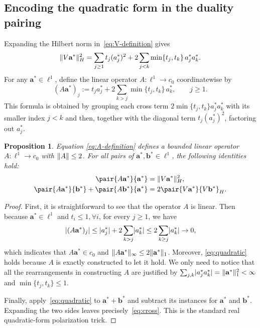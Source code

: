 \documentclass[11pt,a4paper]{article}
\theoremstyle{reportstyle}
\newtheorem{proposition}[lemma]{Proposition}
\numberwithin{equation}{section}
\newcommand{\ba}{\mathbf a}
\newcommand{\bb}{\mathbf b}
\DeclarePairedDelimiter{\norm}{\lVert}{\rVert}
\DeclarePairedDelimiter{\abs}{\lvert}{\rvert}
\begin{document}
	\subsection{Encoding the quadratic form in the duality pairing}
	\label{subsec:A}

	Expanding the Hilbert norm in~\eqref{eq:V-definition} gives
	$$ \norm{V\ba^*}_H^2 =\sum_{j\ge1}t_j(a_j^*)^2 +2\sum_{j<k}\min\{t_j,t_k\}\,a_j^*a_k^*. $$
	For any $\ba^*\in\ell^1$, define the linear operator $A:\ell^1\to c_0$ coordinatewise by
	\begin{equation}
		(A\ba^*)_j :=t_j a_j^*+2\sum_{k>j}\min\{t_j,t_k\}\,a_k^*, \qquad j\ge1.
		\label{eq:A-definition}
	\end{equation}
	This formula is obtained by grouping each cross term $2\min\{t_j,t_k\}a_j^*a_k^*$ with its smaller index $j<k$ and then, together with the diagonal term $t_j(a_j^*)^2$, factoring out $a_j^*$.
	\begin{proposition}
		\label{prop:A}
		Equation \ref{eq:A-definition} defines a bounded linear operator $A:\ell^1\to c_0$
		with $\norm{A}\le2$. For all pairs of $\ba^*,\bb^*\in\ell^1$, the following identities hold:
		\begin{align}
			\pair{A\ba^*}{\ba^*} &=\norm{V\ba^*}_H^2, \label{eq:quadratic}\\
			\pair{A\ba^*}{\bb^*}+\pair{A\bb^*}{\ba^*} &=2\pair{V\ba^*}{V\bb^*}_H.
			\label{eq:cross}
		\end{align}
	\end{proposition}

	\begin{proof}
		First, it is straightforward to see that the operator $A$ is linear. Then because $\ba^*\in\ell^1$ and $t_i\leq 1, \forall i$, for every $j\ge1$, we have
		$$ \abs{(A\ba^*)_j} \le\abs{a_j^*}+2\sum_{k>j}\abs{a_k^*} \le2\sum_{k\ge j}\abs{a_k^*}\rightarrow0, $$
		which indicates that $A\ba^*\in c_0$ and
		$\norm{A\ba^*}_\infty\le2\norm{\ba^*}_1$.  Moreover, \eqref{eq:quadratic} holds because $A$ is exactly constructed to let it hold. We only need to notice that all the rearrangements in constructing $A$ are justified by $\sum_{j,k}\abs{a_j^*a_k^*}=\norm{\ba^*}_1^2<\infty$ and $\min\{t_j,t_k\}\le1$.

		Finally, apply~\eqref{eq:quadratic} to $\ba^*+\bb^*$ and subtract its
		instances for $\ba^*$ and $\bb^*$. Expanding the two sides leaves
		precisely~\eqref{eq:cross}. This is the standard real quadratic-form polarization trick.
	\end{proof}
\end{document}
